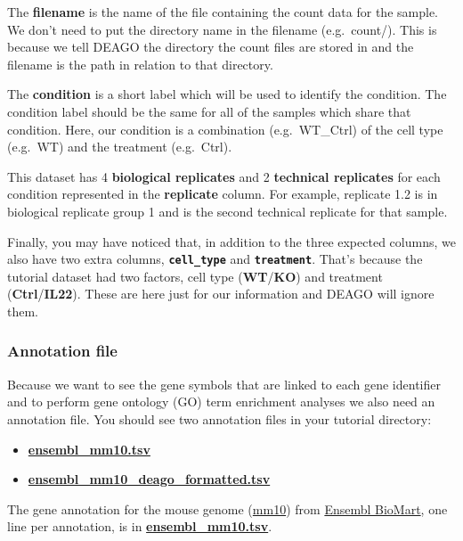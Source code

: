 \documentclass[11pt]{article}
\begin{document}
The \textbf{filename} is the name of the file containing the count data
for the sample. We don't need to put the directory name in the filename
(e.g.~count/). This is because we tell DEAGO the directory the count
files are stored in and the filename is the path in relation to that
directory.

The \textbf{condition} is a short label which will be used to identify
the condition. The condition label should be the same for all of the
samples which share that condition. Here, our condition is a combination
(e.g.~WT\_Ctrl) of the cell type (e.g.~WT) and the treatment
(e.g.~Ctrl).

This dataset has 4 \textbf{biological replicates} and 2
\textbf{technical replicates} for each condition represented in the
\textbf{replicate} column. For example, replicate 1.2 is in biological
replicate group 1 and is the second technical replicate for that sample.

Finally, you may have noticed that, in addition to the three expected
columns, we also have two extra columns, \textbf{\texttt{cell\_type}}
and \textbf{\texttt{treatment}}. That's because the tutorial dataset had
two factors, cell type (\textbf{WT}/\textbf{KO}) and treatment
(\textbf{Ctrl}/\textbf{IL22}). These are here just for our information
and DEAGO will ignore them.

    \hypertarget{annotation-file}{%
\subsubsection{Annotation file}\label{annotation-file}}

Because we want to see the gene symbols that are linked to each gene
identifier and to perform gene ontology (GO) term enrichment analyses we
also need an annotation file. You should see two annotation files in
your tutorial directory:

\begin{itemize}
\item
  \href{data/ensembl_mm10.tsv}{\textbf{ensembl\_mm10.tsv}}
\item
  \href{data/ensembl_mm10_deago_formatted.tsv}{\textbf{ensembl\_mm10\_deago\_formatted.tsv}}
\end{itemize}

The gene annotation for the mouse genome
(\href{https://www.ensembl.org/Mus_musculus/Info/Annotation}{mm10}) from
\href{https://www.ensembl.org/biomart}{Ensembl BioMart}, one line per
annotation, is in
\href{data/ensembl_mm10.tsv}{\textbf{ensembl\_mm10.tsv}}.
\end{document}
